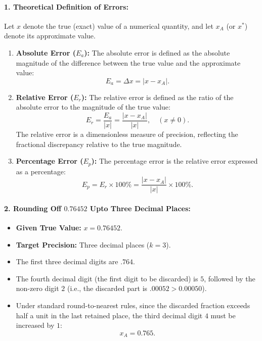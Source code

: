 \documentclass[11pt,a4paper]{article}
\begin{document}
\paragraph{1. Theoretical Definition of Errors:}
Let $x$ denote the true (exact) value of a numerical quantity, and let $x_A$ (or $x^*$) denote its approximate value.
\begin{enumerate}[label=(\roman*)]
    \item \textbf{Absolute Error ($E_a$):} The absolute error is defined as the absolute magnitude of the difference between the true value and the approximate value:
    \[
    E_a = \Delta x = |x - x_A|.
    \]
    \item \textbf{Relative Error ($E_r$):} The relative error is defined as the ratio of the absolute error to the magnitude of the true value:
    \[
    E_r = \frac{E_a}{|x|} = \frac{|x - x_A|}{|x|}, \quad (x \neq 0).
    \]
    The relative error is a dimensionless measure of precision, reflecting the fractional discrepancy relative to the true magnitude.
    \item \textbf{Percentage Error ($E_p$):} The percentage error is the relative error expressed as a percentage:
    \[
    E_p = E_r \times 100\% = \frac{|x - x_A|}{|x|} \times 100\%.
    \]
\end{enumerate}

\paragraph{2. Rounding Off $0.76452$ Upto Three Decimal Places:}
\begin{itemize}
    \item \textbf{Given True Value:} $x = 0.76452$.
    \item \textbf{Target Precision:} Three decimal places ($k = 3$).
    \item The first three decimal digits are $.764$.
    \item The fourth decimal digit (the first digit to be discarded) is $5$, followed by the non-zero digit $2$ (i.e., the discarded part is $.00052 > 0.00050$).
    \item Under standard round-to-nearest rules, since the discarded fraction exceeds half a unit in the last retained place, the third decimal digit $4$ must be increased by $1$:
    \[
    x_A = 0.765.
    \]
\end{itemize}
\end{document}
